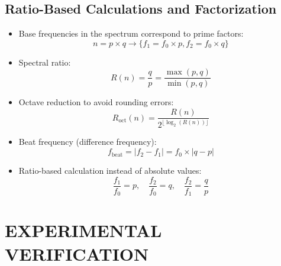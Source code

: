\documentclass[12pt,a4paper]{article}
\begin{document}
	\subsection{Ratio-Based Calculations and Factorization}
	\begin{itemize}
		\item Base frequencies in the spectrum correspond to prime factors:
		\begin{equation}
			n = p \times q \rightarrow \{f_1 = f_0 \times p, f_2 = f_0 \times q\}
		\end{equation}
		
		\item Spectral ratio:
		\begin{equation}
			R(n) = \frac{q}{p} = \frac{\max(p,q)}{\min(p,q)}
		\end{equation}
		
		\item Octave reduction to avoid rounding errors:
		\begin{equation}
			R_{\text{oct}}(n) = \frac{R(n)}{2^{\lfloor\log_2(R(n))\rfloor}}
		\end{equation}
		
		\item Beat frequency (difference frequency):
		\begin{equation}
			f_{\text{beat}} = |f_2 - f_1| = f_0 \times |q - p|
		\end{equation}
		
		\item Ratio-based calculation instead of absolute values:
		\begin{equation}
			\frac{f_1}{f_0} = p, \quad \frac{f_2}{f_0} = q, \quad \frac{f_2}{f_1} = \frac{q}{p}
		\end{equation}
	\end{itemize}
	
	\section{EXPERIMENTAL VERIFICATION}
\end{document}
